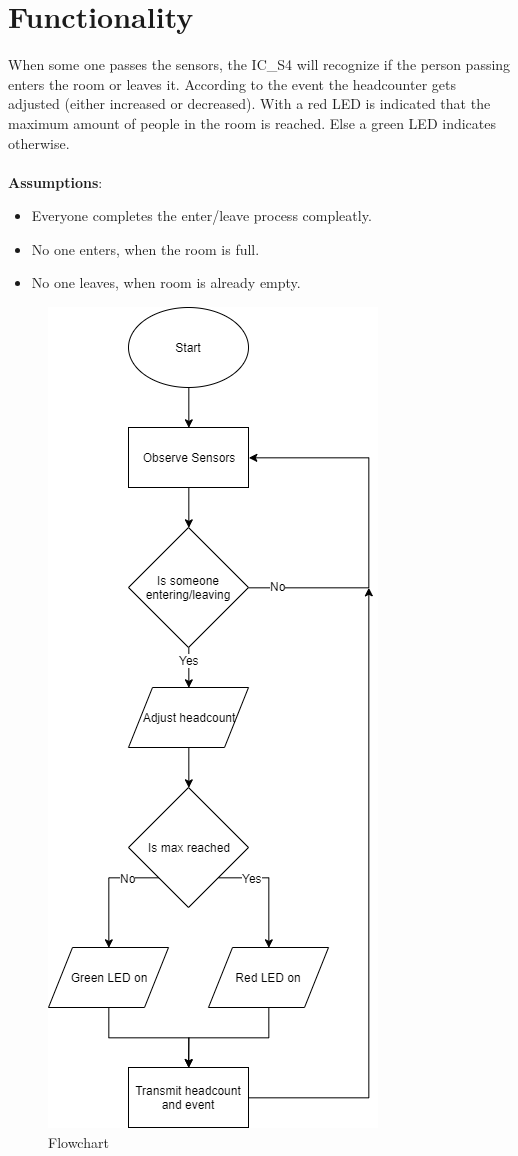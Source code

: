 \documentclass[12pt,a4 paper] {report}
\begin{document}
\newpage

\section*{Functionality}
When some one passes the sensors, the IC\_S4 will recognize if the person passing enters the room or leaves it. 
According to the event the headcounter gets adjusted (either increased or decreased). With a red LED is indicated that 
the maximum amount of people in the room is reached. Else a green LED indicates otherwise. \\ \\
\textbf{Assumptions}:
\begin{itemize}
	\item Everyone completes the enter/leave process compleatly.
	\item No one enters, when the room is full.
	\item No one leaves, when room is already empty.
\end{itemize}
\begin{figure}[h]
	\centering	
	\includegraphics[scale=0.5]{../png/flowchart.png}
	\caption{Flowchart}
\end{figure}
\end{document}

